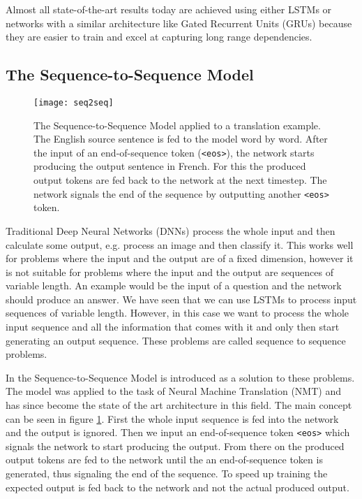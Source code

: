 Almost all state-of-the-art results today are achieved using either LSTMs or networks with a similar architecture like Gated Recurrent Units (GRUs) \cite{gru} because they are easier to train and excel at capturing long range dependencies.

\subsection{The Sequence-to-Sequence Model}

\begin{figure}[t]
\centering
\texttt{[image: seq2seq]}
\caption{The Sequence-to-Sequence Model applied to a translation example. The English source sentence is fed to the model word by word. After the input of an end-of-sequence token (\texttt{<eos>}), the network starts producing the output sentence in French. For this the produced output tokens are fed back to the network at the next timestep. The network signals the end of the sequence by outputting another \texttt{<eos>} token.}
\label{seq2seq}
\end{figure}

Traditional Deep Neural Networks (DNNs) process the whole input and then calculate some output, e.g. process an image and then classify it. This works well for problems where the input and the output are of a fixed dimension, however it is not suitable for problems where the input and the output are sequences of variable length. An example would be the input of a question and the network should produce an answer. We have seen that we can use LSTMs to process input sequences of variable length. However, in this case we want to process the whole input sequence and all the information that comes with it and only then start generating an output sequence. These problems are called sequence to sequence problems.

In \cite{seq2seq} the Sequence-to-Sequence Model is introduced as a solution to these problems. The model was applied to the task of Neural Machine Translation (NMT) and has since become the state of the art architecture in this field. The main concept can be seen in figure \ref{seq2seq}. First the whole input sequence is fed into the network and the output is ignored. Then we input an end-of-sequence token \texttt{<eos>} which signals the network to start producing the output. From there on the produced output tokens are fed to the network until the an end-of-sequence token is generated, thus signaling the end of the sequence. To speed up training the expected output is fed back to the network and not the actual produced output.

